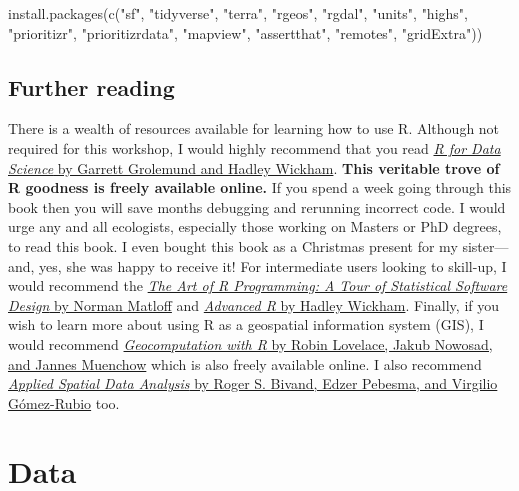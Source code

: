\documentclass[
  12pt,
]{book}
\newenvironment{Shaded}{\begin{snugshade}}{\end{snugshade}}
\newcommand{\FunctionTok}[1]{\textcolor[rgb]{0.00,0.00,0.00}{#1}}
\newcommand{\NormalTok}[1]{#1}
\newcommand{\StringTok}[1]{\textcolor[rgb]{0.31,0.60,0.02}{#1}}
\begin{document}
\begin{Shaded}
\begin{Highlighting}[]
\FunctionTok{install.packages}\NormalTok{(}\FunctionTok{c}\NormalTok{(}\StringTok{"sf"}\NormalTok{, }\StringTok{"tidyverse"}\NormalTok{, }\StringTok{"terra"}\NormalTok{, }\StringTok{"rgeos"}\NormalTok{, }\StringTok{"rgdal"}\NormalTok{, }
                   \StringTok{"units"}\NormalTok{, }\StringTok{"highs"}\NormalTok{, }\StringTok{"prioritizr"}\NormalTok{, }\StringTok{"prioritizrdata"}\NormalTok{, }
                   \StringTok{"mapview"}\NormalTok{, }\StringTok{"assertthat"}\NormalTok{, }\StringTok{"remotes"}\NormalTok{, }\StringTok{"gridExtra"}\NormalTok{))}
\end{Highlighting}
\end{Shaded}

\hypertarget{further-reading}{%
\section{Further reading}\label{further-reading}}

There is a wealth of resources available for learning how to use R. Although not required for this workshop, I would highly recommend that you read \href{https://r4ds.had.co.nz/}{\emph{R for Data Science} by Garrett Grolemund and Hadley Wickham}. \textbf{This veritable trove of R goodness is freely available online.} If you spend a week going through this book then you will save months debugging and rerunning incorrect code. I would urge any and all ecologists, especially those working on Masters or PhD degrees, to read this book. I even bought this book as a Christmas present for my sister---and, yes, she was happy to receive it! For intermediate users looking to skill-up, I would recommend the \href{http://shop.oreilly.com/product/9781593273842.do}{\emph{The Art of R Programming: A Tour of Statistical Software Design} by Norman Matloff} and \href{https://adv-r.hadley.nz/}{\emph{Advanced R} by Hadley Wickham}. Finally, if you wish to learn more about using R as a geospatial information system (GIS), I would recommend \href{https://geocompr.robinlovelace.net/}{\emph{Geocomputation with R} by Robin Lovelace, Jakub Nowosad, and Jannes Muenchow} which is also freely available online. I also recommend \href{https://www.springer.com/gp/book/9781461476177}{\emph{Applied Spatial Data Analysis} by Roger S. Bivand, Edzer Pebesma, and Virgilio Gómez-Rubio} too.

\hypertarget{data}{%
\chapter{Data}\label{data}}
\end{document}
